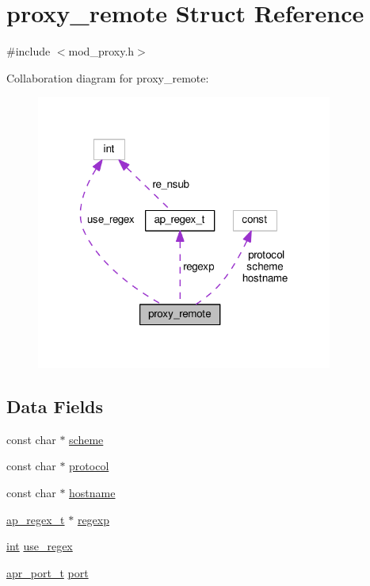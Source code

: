 \hypertarget{structproxy__remote}{}\section{proxy\+\_\+remote Struct Reference}
\label{structproxy__remote}


{\ttfamily \#include $<$mod\+\_\+proxy.\+h$>$}



Collaboration diagram for proxy\+\_\+remote\+:
\nopagebreak
\begin{figure}[H]
\begin{center}
\leavevmode
\includegraphics[width=276pt]{structproxy__remote__coll__graph}
\end{center}
\end{figure}
\subsection*{Data Fields}
\begin{DoxyCompactItemize}
\item 
const char $\ast$ \hyperlink{structproxy__remote_afdc9a26087ae93c71ae48cc586cd18cc}{scheme}
\item 
const char $\ast$ \hyperlink{structproxy__remote_a5279d009416d26c68a58a8b25b021726}{protocol}
\item 
const char $\ast$ \hyperlink{structproxy__remote_a0b5bc6bdc32977d4f6a03c2594292e5d}{hostname}
\item 
\hyperlink{structap__regex__t}{ap\+\_\+regex\+\_\+t} $\ast$ \hyperlink{structproxy__remote_ac21f82bf2082c3da0bb5bebbbfe78972}{regexp}
\item 
\hyperlink{pcre_8txt_a42dfa4ff673c82d8efe7144098fbc198}{int} \hyperlink{structproxy__remote_a9c7d2244047ad71e288cb5cc0d3b12db}{use\+\_\+regex}
\item 
\hyperlink{group__apr__network__io_gaa670a71960f6eb4fe0d0de2a1e7aba03}{apr\+\_\+port\+\_\+t} \hyperlink{structproxy__remote_a82755511b2c75ab877b33885fba97cbe}{port}
\end{DoxyCompactItemize}


